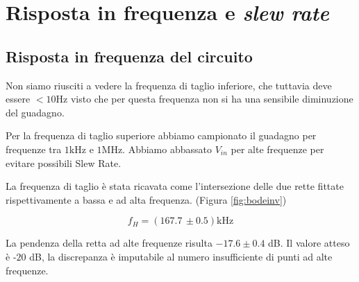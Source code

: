 \documentclass[10pt,a4paper]{article}
\begin{document}
	\section{Risposta in frequenza e \emph{slew rate}}
	\subsection{Risposta in frequenza del circuito}
	Non siamo riusciti a vedere la frequenza di taglio inferiore, che tuttavia deve essere   $ <10\mathrm{Hz}$ visto che per questa frequenza  non si ha una sensibile diminuzione del guadagno.

 Per la frequenza di taglio superiore abbiamo campionato il guadagno per frequenze tra $1\mathrm{kHz}$ e $ 1\mathrm{MHz}.$
Abbiamo abbassato $V_{in}$ per alte frequenze per evitare   possibili Slew Rate.

La frequenza di taglio è stata ricavata come l'intersezione delle due rette fittate rispettivamente a bassa e ad alta frequenza.
(Figura \ref{fig:bodeinv})



	
	\[
	f_H =  (167.7 \,\pm 0.5)\mathrm{kHz}
	\]

La pendenza della retta ad alte frequenze risulta   $ -17.6 \pm 0.4 $ dB. Il valore atteso è -$20$ dB, la discrepanza è imputabile al numero insufficiente di punti ad alte frequenze. 
\end{document}
